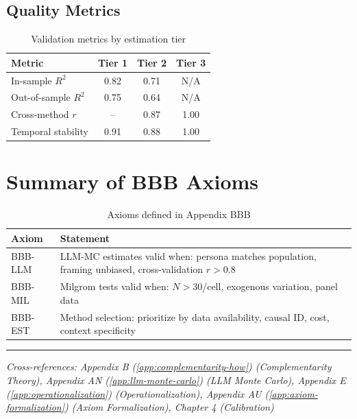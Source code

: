 \documentclass[11pt,a4paper]{article}
\theoremstyle{definition}
\begin{document}
\subsection{Quality Metrics}

\begin{table}[h]
\centering
\begin{tabular}{lccc}
\toprule
\textbf{Metric} & \textbf{Tier 1} & \textbf{Tier 2} & \textbf{Tier 3} \\
\midrule
In-sample $R^2$ & 0.82 & 0.71 & N/A \\
Out-of-sample $R^2$ & 0.75 & 0.64 & N/A \\
Cross-method $r$ & -- & 0.87 & 1.00 \\
Temporal stability & 0.91 & 0.88 & 1.00 \\
\bottomrule
\end{tabular}
\caption{Validation metrics by estimation tier}
\label{tab:validation}
\end{table}


\section{Summary of BBB Axioms}
\label{sec:bbb-axioms}

\begin{table}[h]
\centering
\begin{tabular}{lp{10cm}}
\toprule
\textbf{Axiom} & \textbf{Statement} \\
\midrule
BBB-LLM & LLM-MC estimates valid when: persona matches population, framing unbiased, cross-validation $r > 0.8$ \\
BBB-MIL & Milgrom tests valid when: $N > 30$/cell, exogenous variation, panel data \\
BBB-EST & Method selection: prioritize by data availability, causal ID, cost, context specificity \\
\bottomrule
\end{tabular}
\caption{Axioms defined in Appendix BBB}
\label{tab:bbb-axioms}
\end{table}

\vspace{1em}
\hrule
\vspace{0.5em}
\noindent\textit{Cross-references: Appendix B (\ref{app:complementarity-how}) (Complementarity Theory), 
Appendix AN (\ref{app:llm-monte-carlo}) (LLM Monte Carlo), Appendix E (\ref{app:operationalization}) (Operationalization), 
Appendix AU (\ref{app:axiom-formalization}) (Axiom Formalization), Chapter 4 (Calibration)}
\end{document}
